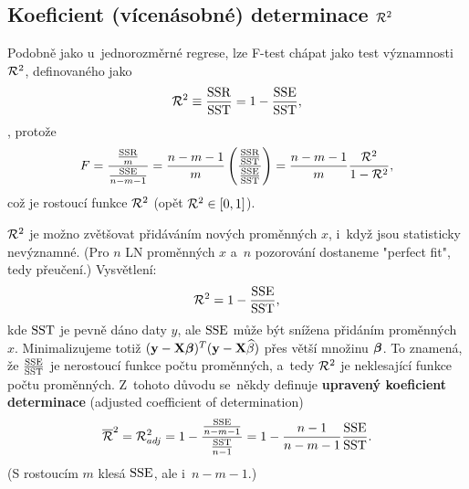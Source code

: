  \subsection*{Koeficient (vícenásobné) determinace $\mathcal{R}^2$ }
 Podobně jako u~jednorozměrné regrese, lze F-test chápat jako test významnosti $\mathcal{R}^2$, definovaného jako
 $$ \mathcal{R}^2\equiv \frac{\mathrm{SSR}}{\mathrm{SST}} = 1-\frac{\mathrm{SSE}}{\mathrm{SST}}, $$
, protože
 $$ F = \frac{\frac{\mathrm{SSR}}{m}}{\frac{\mathrm{SSE}}{n-m-1}} = \frac{n-m-1}{m}\left(\frac{\frac{\mathrm{SSR}}{\mathrm{SST}}}{\frac{\mathrm{SSE}}{\mathrm{SST}}} \right) = \frac{n-m-1}{m}\frac{\mathcal{R}^2}{1-\mathcal{R}^2}, $$
 což je rostoucí funkce $\mathcal{R}^2$ (opět $\mathcal{R}^2\in[0,1]$).
 \begin{remark}
 	 $\mathcal{R}^2$ je možno zvětšovat přidáváním nových proměnných $x$, i~když jsou statisticky nevýznamné. (Pro $n$ LN proměnných $x$ a~$n$ pozorování dostaneme "perfect fit", tedy přeučení.) Vysvětlení:
 	 $$ \mathcal{R}^2 = 1-\frac{\mathrm{SSE}}{\mathrm{SST}}, $$
 	kde $\mathrm{SST}$ je pevně dáno daty $y$, ale $\mathrm{SSE}$ může být snížena přidáním proměnných $x$. Minimalizujeme totiž $(\mathbf{y}-\mathbf{X}\boldsymbol{\beta})^T(\mathbf{y}-\mathbf{X}\widehat{\beta})$ přes větší množinu $\boldsymbol{\beta}$. To znamená, že $\frac{\mathrm{SSE}}{\mathrm{SST}}$ je nerostoucí funkce počtu proměnných, a~tedy $\mathcal{R}^2$ je neklesající funkce počtu proměnných. Z~tohoto důvodu se~někdy definuje \textbf{upravený koeficient determinace} (adjusted coefficient of determination)
 	 $$ \overline{\mathcal{R}}^2 = \mathcal{R}_{adj}^2 = 1-\frac{\frac{\mathrm{SSE}}{n-m-1}}{\frac{\mathrm{SST}}{n-1}} = 1-\frac{n-1}{n-m-1}\frac{\mathrm{SSE}}{\mathrm{SST}}. $$
 	(S rostoucím $m$ klesá $\mathrm{SSE}$, ale i~$n-m-1$.)
 \end{remark}
